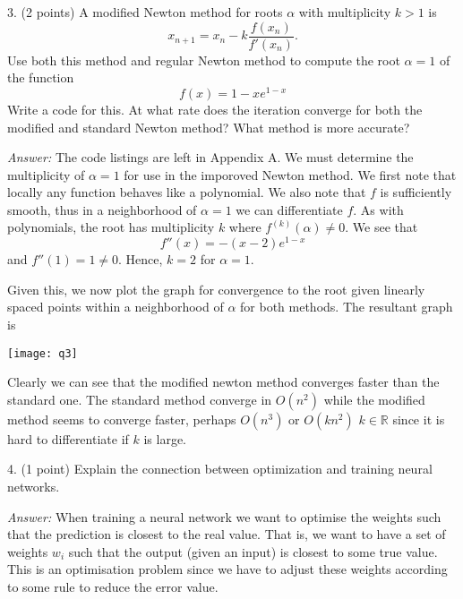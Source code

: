 \documentclass{article}
\newcommand{\R}{\mathbb{R}}
\newenvironment{answer}{\textit{Answer:}}{}
\begin{document}
3. (2 points) A modified Newton method for roots $\alpha$ with multiplicity
$k > 1$ is
\begin{equation*}
    x_{n+1} = x_n - k \frac{f(x_n)}{f'(x_n)}.
\end{equation*}
Use both this method and regular Newton method to compute the root
$\alpha = 1$ of the function
\begin{equation*}
    f(x) = 1 - xe^{1-x}
\end{equation*}
Write a code for this. At what rate does the iteration converge for both the
modified and standard Newton method? What method is more accurate?

\begin{answer}
    The code listings are left in Appendix A. We must determine the multiplicity
    of $\alpha = 1$ for use in the imporoved Newton method. We first note that
    locally any function behaves like a polynomial. We also note that $f$ is
    sufficiently smooth, thus in a neighborhood of
    $\alpha = 1$ we can differentiate $f$. As with polynomials, the root has
    multiplicity $k$ where $f^{(k)}(\alpha) \neq 0$. We see that
    \begin{equation*}
        f''(x) = -(x-2)e^{1-x}
    \end{equation*}
    and $f''(1) = 1 \neq 0$. Hence, $k = 2$ for $\alpha = 1$.

    Given this, we now plot the graph for convergence to the root given
    linearly spaced points within a neighborhood of $\alpha$
    for both methods. The resultant graph is

    \texttt{[image: q3]}

    Clearly we can see that the modified newton method converges faster
    than the standard one. The standard method converge in $O(n^2)$ while
    the modified method seems to converge faster, perhaps $O(n^3)$ or
    $O(kn^2)$ $k\in\R$ since it is hard to differentiate if $k$ is large.
\end{answer}

4. (1 point) Explain the connection between optimization and training neural
networks. %

\begin{answer}
    When training a neural network we want to optimise the weights such that the
    prediction is closest to the real value. That is, we want to have a set of weights
    $w_i$ such that the output (given an input) is closest to some true value.
    This is an optimisation problem since we have to adjust these weights
    according to some rule to reduce the error value.
\end{answer}
\end{document}
